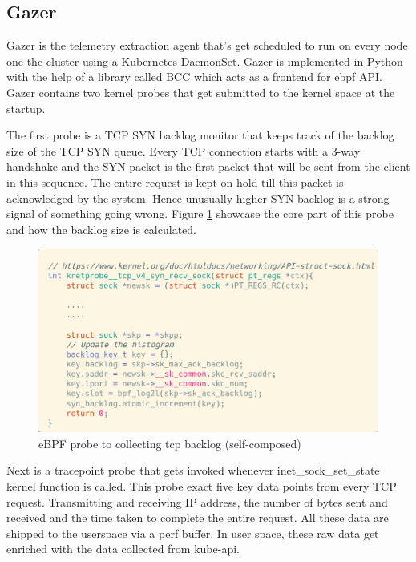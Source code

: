 \subsection{Gazer}

Gazer is the telemetry extraction agent that's get scheduled to run on every node one the cluster using a Kubernetes DaemonSet. Gazer is implemented in Python with the help of a library called BCC which acts as a frontend for \ac{ebpf} API. Gazer contains two kernel probes that get submitted to the kernel space at the startup. 

The first probe is a TCP SYN backlog monitor that keeps track of the backlog size of the TCP SYN queue. Every TCP connection starts with a 3-way handshake and the SYN packet is the first packet that will be sent from the client in this sequence. The entire request is kept on hold till this packet is acknowledged by the system. Hence unusually higher SYN backlog is a strong signal of something going wrong. Figure \ref{fig:backlog-probe} showcase the core part of this probe and how the backlog size is calculated.

\begin{figure}[H]
    \includegraphics[width=14cm]{assets/implementation/backlog-probe.png}
    \caption{eBPF probe to collecting tcp backlog (self-composed)}
    \label{fig:backlog-probe}
\end{figure}

Next is a tracepoint probe that gets invoked whenever inet\_sock\_set\_state kernel function is called. This probe exact five key data points from every TCP request. Transmitting and receiving IP address, the number of bytes sent and received and the time taken to complete the entire request. All these data are shipped to the userspace via a perf buffer. In user space, these raw data get enriched with the data collected from kube-api. 

